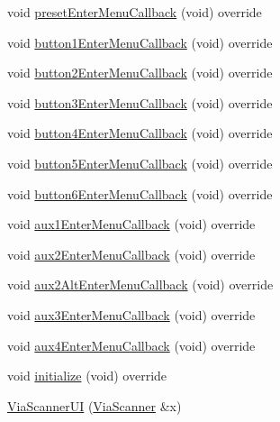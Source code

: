 \begin{DoxyCompactItemize}
void \mbox{\hyperlink{class_via_scanner_1_1_via_scanner_u_i_ac67240d1c9ebc47569185776d9d4403b}{preset\+Enter\+Menu\+Callback}} (void) override
\item 
void \mbox{\hyperlink{class_via_scanner_1_1_via_scanner_u_i_a10b9a54f4fb6ea88203d53041093d650}{button1\+Enter\+Menu\+Callback}} (void) override
\item 
void \mbox{\hyperlink{class_via_scanner_1_1_via_scanner_u_i_acb45c99dcac36f93d98621f6c53c9a0a}{button2\+Enter\+Menu\+Callback}} (void) override
\item 
void \mbox{\hyperlink{class_via_scanner_1_1_via_scanner_u_i_a32f8e4caa95371961883c90a5803f314}{button3\+Enter\+Menu\+Callback}} (void) override
\item 
void \mbox{\hyperlink{class_via_scanner_1_1_via_scanner_u_i_a45b4492b06d3b834c4934ace2d7d15aa}{button4\+Enter\+Menu\+Callback}} (void) override
\item 
void \mbox{\hyperlink{class_via_scanner_1_1_via_scanner_u_i_a337284dc48950fd3140b40ecca57122b}{button5\+Enter\+Menu\+Callback}} (void) override
\item 
void \mbox{\hyperlink{class_via_scanner_1_1_via_scanner_u_i_a94de9ec6e40e16ba7dd8dc0ffb9adc14}{button6\+Enter\+Menu\+Callback}} (void) override
\item 
void \mbox{\hyperlink{class_via_scanner_1_1_via_scanner_u_i_a4ca2d4cfed7e8e23f056c622a825c085}{aux1\+Enter\+Menu\+Callback}} (void) override
\item 
void \mbox{\hyperlink{class_via_scanner_1_1_via_scanner_u_i_a5173aaf7222a059fa7d3a4b32f6fb275}{aux2\+Enter\+Menu\+Callback}} (void) override
\item 
void \mbox{\hyperlink{class_via_scanner_1_1_via_scanner_u_i_a649f3b095e254e2e2049c91f5c9543b2}{aux2\+Alt\+Enter\+Menu\+Callback}} (void) override
\item 
void \mbox{\hyperlink{class_via_scanner_1_1_via_scanner_u_i_ade6dc0e93911fe51731bffa65990599a}{aux3\+Enter\+Menu\+Callback}} (void) override
\item 
void \mbox{\hyperlink{class_via_scanner_1_1_via_scanner_u_i_a34c593dfd035906c09a2cde0024fd48f}{aux4\+Enter\+Menu\+Callback}} (void) override
\item 
void \mbox{\hyperlink{class_via_scanner_1_1_via_scanner_u_i_ab12af2665a9e58574cd0cb4b8a003e0b}{initialize}} (void) override
\item 
\mbox{\hyperlink{class_via_scanner_1_1_via_scanner_u_i_aa18dc59313da3e71d1d4cdb4509d7fa4}{Via\+Scanner\+UI}} (\mbox{\hyperlink{class_via_scanner}{Via\+Scanner}} \&x)
\end{DoxyCompactItemize}
